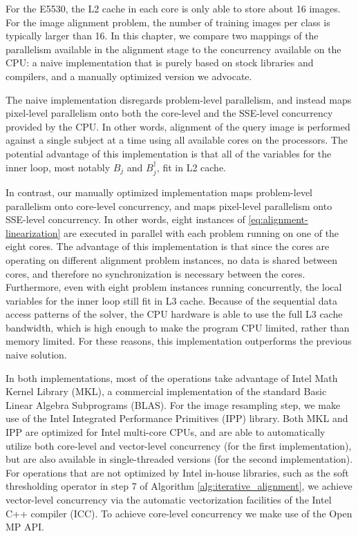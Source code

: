For the E5530, the L2 cache in each core is only able to store about 16 images.
For the image alignment problem, the number of training images per class is
typically larger than 16.  
In this chapter, we compare two mappings of the parallelism available in the alignment
stage to the concurrency available on the CPU: a naive implementation that is purely 
based on stock libraries and compilers, and a manually optimized version we advocate.

The naive implementation disregards 
problem-level parallelism, and instead maps pixel-level parallelism
onto both the core-level and the SSE-level concurrency provided by the CPU.  In
other words, alignment of the query image is performed
against a single subject at a time using all available cores on
the processors.  The potential advantage of this implementation is that all of the variables
for the inner loop, most notably $B_j$ and $B_j^\dagger$, fit in L2 cache.  

In contrast, our manually optimized implementation maps problem-level parallelism onto core-level
concurrency, and maps pixel-level parallelism onto SSE-level concurrency.  In
other words, eight instances of \eqref{eq:alignment-linearization} are executed
in parallel with each problem running on one of the eight cores.  The advantage
of this implementation is that since the cores are operating on different
alignment problem instances, no data is shared between cores, and therefore no
synchronization is necessary between the cores.  Furthermore, even with eight
problem instances running concurrently, the local variables for the inner
loop still fit in L3 cache.  Because of the sequential data access patterns of
the solver, the CPU hardware is able to use the full L3 cache bandwidth, which is 
high enough to make the program CPU limited, rather than memory limited.  
For these reasons, this implementation outperforms the previous naive solution.


In both implementations, most of the operations take
advantage of Intel Math Kernel Library (MKL), a commercial implementation of
the standard Basic Linear Algebra Subprograms (BLAS). For the image resampling
step, we make use of the Intel Integrated Performance Primitives (IPP) library.
Both MKL and IPP are optimized for Intel multi-core CPUs, and are able to
automatically utilize both core-level and vector-level concurrency (for the first implementation),
but are also available in single-threaded versions (for the second implementation). For 
operations that are not optimized by Intel in-house libraries, such as the soft thresholding
operator in step 7 of Algorithm \ref{alg:iterative_alignment}, we achieve 
vector-level concurrency via
the automatic vectorization facilities of the Intel C++ compiler (ICC).
To achieve core-level concurrency we make use of the Open MP API. \cite{dagum2002openmp} 

